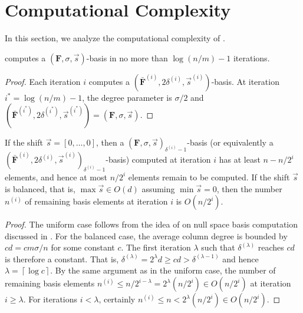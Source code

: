 
\section{Computational Complexity}

\label{sec:complexity}

In this section, we analyze the computational complexity of .
\begin{lem}
 computes a $\left(\mathbf{F},\sigma,\vec{s}\right)$-basis
in no more than $\log\left(n/m\right)-1$ iterations.\end{lem}
\begin{proof}
Each iteration $i$ computes a $(\bar{\mathbf{F}}^{\left(i\right)},2\delta^{\left(i\right)},\vec{s}^{\left(i\right)})$-basis.
At iteration ${i}^{*}=\log(n/m)-1$, the degree parameter is $\sigma/2$
and $(\bar{\mathbf{F}}^{\left({i}^{*}\right)},2\delta^{\left({i}^{*}\right)},\vec{s}^{\left({i}^{*}\right)})=\left(\mathbf{F},\sigma,\vec{s}\right)$.\end{proof}
\begin{lem}
\label{lem:remainingNumberElements}If the shift $\vec{s}=\left[0,\dots,0\right]$,
then a $\left(\mathbf{F},\sigma,\vec{s}\right)_{\delta^{\left(i\right)}-1}$-basis
(or equivalently a $(\bar{\mathbf{F}}^{\left(i\right)},2\delta^{\left(i\right)},\vec{s}^{\left(i\right)})_{\delta^{\left(i\right)}-1}$-basis)
computed at iteration $i$ has at least $n-n/2^{i}$ elements, and
hence at most $n/2^{i}$ elements remain to be computed. If the shift
$\vec{s}$ is balanced, that is, $\max\vec{s}\in O(d)$ assuming $\min\vec{s}=0$,
then the number $n^{\left(i\right)}$ of remaining basis elements
at iteration $i$ is $O(n/2^{i})$.\end{lem}
\begin{proof}
The uniform case follows from the idea of \citet{storjohann-villard:2005}
on null space basis computation discussed in .
For the balanced case, the average column degree is bounded by $cd=cm\sigma/n$
for some constant $c$. The first iteration $\lambda$ such that $\delta^{\left(\lambda\right)}$
reaches $cd$ is therefore a constant. That is, $\delta^{\left(\lambda\right)}=2^{\lambda}d\ge cd>\delta^{\left(\lambda-1\right)}$
and hence $\lambda=\left\lceil \log c\right\rceil $. By the same
argument as in the uniform case, the number of remaining basis elements
$n^{\left(i\right)}\le n/2^{i-\lambda}=2^{\lambda}(n/2^{i})\in O(n/2^{i})$
at iteration $i\ge\lambda$. For iterations $i<\lambda$, certainly
$n^{\left(i\right)}\le n<2^{\lambda}(n/2^{i})\in O(n/2^{i})$.\end{proof}
